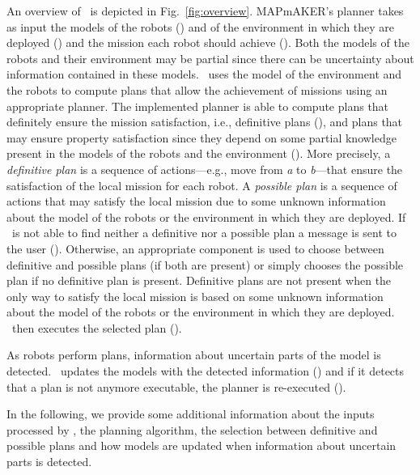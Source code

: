 
An overview of \toolName\ is depicted in Fig.~\ref{fig:overview}.
MAPmAKER's planner takes as input the models of the robots () and of the environment in which they are deployed () and the mission each robot should achieve ().
Both the models of the robots and their environment may be partial since there can be uncertainty about information contained in these models.
\toolName\ uses the model of the environment and the robots to compute plans that allow the achievement of missions using an appropriate planner.
The implemented planner is able to compute plans that definitely ensure the mission satisfaction, i.e., definitive plans  (), and plans that may ensure property satisfaction since they depend on some partial knowledge present in the models of the robots and the environment  ().
More precisely, a \emph{definitive plan} is a sequence of actions---e.g., move from \emph{a} to \emph{b}---that ensure the satisfaction of the local mission for each robot. 
A \emph{possible plan} is a sequence of actions that may satisfy the local mission due to some unknown information about the model of the robots or the environment in which they are deployed. 
If \toolName\ is not able to find neither a definitive nor a possible plan a message is sent to the user ().
Otherwise, an appropriate component is used to choose between definitive and possible plans (if both are present) or simply chooses the possible plan if no definitive plan is present.
Definitive plans are not present when the only way to satisfy the local mission is based on some unknown information about the model of the robots or the environment in which they are deployed. 
\toolName\ then executes the selected plan ().

As robots perform plans, information about uncertain parts of the model is detected.
\toolName\ updates the  models with the detected information () and if it detects that a plan is not anymore executable, the planner is re-executed ().


In the following, we provide some additional information about the inputs processed  by \toolName, the planning algorithm, the selection between definitive and possible plans and how models are updated when information about uncertain parts is detected.


